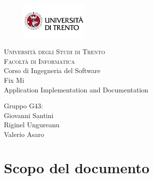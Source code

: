 \documentclass{report}
\begin{document}
	
	
	\begin{titlepage}
		\begin{figure}[t]
			\centering\includegraphics[width=0.3\textwidth]{images/unitn-logo}
		\end{figure}
		\begin{center}
			\textsc{ \LARGE{Università degli Studi di Trento \\}}
			\textsc{ \LARGE{Facoltà di Informatica\\ }}
			\textnormal{ \LARGE{Corso di Ingegneria del Software\\}}
			\vspace{30mm}
			\fontsize{10mm}{7mm}\selectfont 
			\textup{Fix Mi \\ Application Implementation and Documentation}\\
		\end{center}
		
		\vspace{25mm}
		
		\centering
		\large Gruppo G43: \\ Giovanni Santini\\ Riginel Ungureanu \\ Valerio Asaro
		
		\vspace{20mm}
		
		
	\end{titlepage}
	
	
	
	
	\pagestyle{fancy}
	\fancyhead[R]{\chaptername\ \thechapter}  %
	
	\tableofcontents
	\newpage
	
	
	
	\section{Scopo del documento}
	
\end{document}
